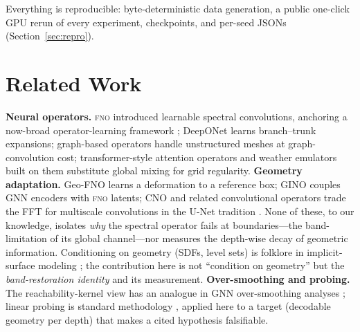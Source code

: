 \documentclass[11pt]{article}
\theoremstyle{definition}
\newcommand{\fno}{\textsc{fno}}
\begin{document}
Everything is reproducible: byte-deterministic data generation, a public
one-click GPU rerun of every experiment, checkpoints, and per-seed JSONs
(Section~\ref{sec:repro}).

\section{Related Work}
\label{sec:related}\textbf{Neural operators.} \fno{} \citep{li2021fno} introduced learnable
spectral convolutions, anchoring a now-broad operator-learning framework
\citep{kovachki2023nocal}; DeepONet \citep{lu2021deeponet} learns branch--trunk
expansions; graph-based operators \citep{li2021grafno, pfaff2021learning}
handle
unstructured meshes at graph-convolution cost; transformer-style attention
operators \citep{cao2021galerkin, hao2023gnot} and weather emulators built on
them \citep{bi2023graphcast, lam2023learning} substitute global mixing for
grid regularity. \textbf{Geometry
adaptation.} Geo-FNO \citep{mao2023geofno} learns a deformation to a reference
box; GINO \citep{yin2023gino} couples GNN encoders with \fno{} latents;
CNO \citep{raonic2024cno} and related convolutional operators trade the FFT
for multiscale convolutions in the U-Net tradition \citep{ronneberger2015unet}. None of these, to our knowledge, isolates
\emph{why} the spectral operator fails at boundaries---the band-limitation of
its global channel---nor measures the depth-wise decay of geometric
information. Conditioning on geometry (SDFs, level sets) is folklore in
implicit-surface modeling \citep{park2019deepsdf}; the contribution here is not ``condition on
geometry'' but the \emph{band-restoration identity} and its measurement.
\textbf{Over-smoothing and probing.} The reachability-kernel view has an
analogue in GNN over-smoothing analyses \citep{rusch2023survey}; linear probing
is standard methodology \citep{alain2017probing}, applied here to a target
(decodable geometry per depth) that makes a cited hypothesis falsifiable.
\end{document}
